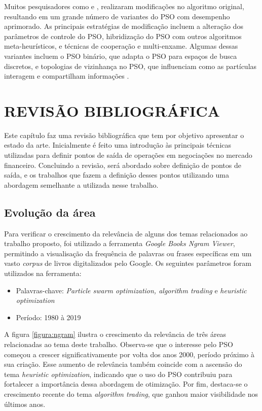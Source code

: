 \documentclass{iftex2024}
\begin{document}
Muitos pesquisadores como \textcite{erwinPSO} e \textcite{CorreaPSO}, realizaram modificações no algoritmo original, resultando
em um grande número de variantes do PSO com desempenho aprimorado. As principais
estratégias de modificação incluem a alteração dos parâmetros de controle do PSO,
hibridização do PSO com outros algoritmos meta-heurísticos, e técnicas de cooperação e
multi-enxame. Algumas dessas variantes incluem o PSO binário, que adapta o
PSO para espaços de busca discretos, e topologias de vizinhança no PSO, que influenciam
como as partículas interagem e compartilham informações \cite{WOS:000986168700001}.

\chapter{REVISÃO BIBLIOGRÁFICA}

Este capítulo faz uma revisão bibliográfica que tem por objetivo apresentar o
estado da arte. Inicialmente é feito uma
introdução às principais técnicas utilizadas para definir pontos de saída de operações em
negociações no mercado financeiro. Concluindo a revisão, será abordado sobre definição de pontos de saída, e os 
trabalhos que fazem a definição desses pontos utilizando uma abordagem
semelhante a utilizada nesse trabalho.

\section{Evolução da área}

Para verificar o crescimento da relevância de alguns dos temas relacionados ao
trabalho proposto, foi utilizado a ferramenta \textit{Google Books Ngram Viewer}, permitindo a
visualisação da frequência de palavras ou frases específicas em um vasto \textit{corpus} de livros
digitalizados pelo Google. Os seguintes parâmetros foram utilizados na ferramenta:

\begin{itemize}
  \item Palavras-chave: \textit{Particle swarm optimization, algorithm trading} e \textit{heuristic optimization}
  \item Período: 1980 à 2019
\end{itemize}

A figura \ref{figura:ngram} ilustra o crescimento da relevância de três áreas relacionadas ao tema deste trabalho. 
Observa-se que o interesse pelo PSO começou a crescer significativamente por volta dos anos 2000, período próximo 
à sua criação. Esse aumento de relevância também coincide com a ascensão do tema \textit{heuristic optimization}, indicando 
que o uso do PSO contribuiu para fortalecer a importância dessa abordagem de otimização. Por fim, destaca-se o crescimento 
recente do tema \textit{algorithm trading}, que ganhou maior visibilidade nos últimos anos.
\end{document}
